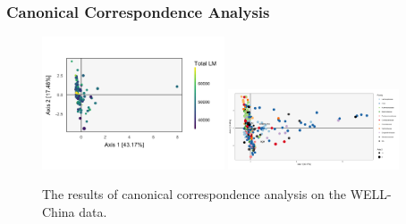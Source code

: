 \documentclass{beamer}
\begin{document}
\begin{frame}
  \frametitle{Canonical Correspondence Analysis}
\begin{figure}[ht]
  \centering
  \includegraphics[width=0.48\textwidth]{figure/ccpna_scores_total_lm}
  \includegraphics[width=0.45\textwidth]{figure/ccpna_loadings}
  \caption{The results of canonical correspondence analysis on the WELL-China
    data.\label{fig:ccpna_scores_loadings} }
\end{figure}
\end{frame}
\end{document}
